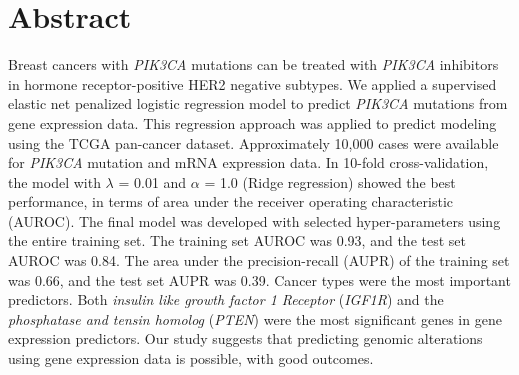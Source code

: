 \documentclass[10pt,letterpaper]{article}
\newcommand{\getIndex}[2]{
  \ForEach{,}{\IfEq{#1}{\thislevelitem}{\number\thislevelcount\ExitForEach}{}}{#2}
}
\newcommand{\getAff}[1]{
  \getIndex{#1}{Department of Hospital Pathology, Seoul St.~Mary's Hospital}
}
\begin{document}
\vspace*{0.2in}

\section*{Abstract}
Breast cancers with \emph{PIK3CA} mutations can be treated with
\emph{PIK3CA} inhibitors in hormone receptor-positive HER2 negative
subtypes. We applied a supervised elastic net penalized logistic
regression model to predict \emph{PIK3CA} mutations from gene expression
data. This regression approach was applied to predict modeling using the
TCGA pan-cancer dataset. Approximately 10,000 cases were available for
\emph{PIK3CA} mutation and mRNA expression data. In 10-fold
cross-validation, the model with \(\lambda\) = 0.01 and \(\alpha\) = 1.0
(Ridge regression) showed the best performance, in terms of area under
the receiver operating characteristic (AUROC). The final model was
developed with selected hyper-parameters using the entire training set.
The training set AUROC was 0.93, and the test set AUROC was 0.84. The
area under the precision-recall (AUPR) of the training set was 0.66, and
the test set AUPR was 0.39. Cancer types were the most important
predictors. Both \emph{insulin like growth factor 1 Receptor}
(\emph{IGF1R}) and the \emph{phosphatase and tensin homolog}
(\emph{PTEN}) were the most significant genes in gene expression
predictors. Our study suggests that predicting genomic alterations using
gene expression data is possible, with good outcomes.
\end{document}
